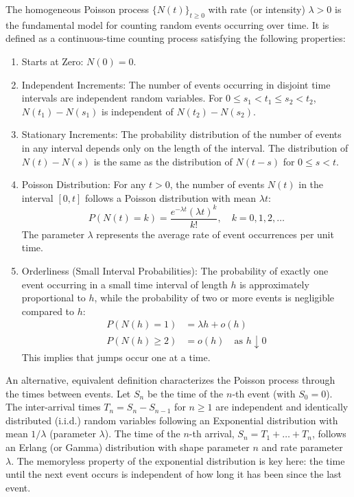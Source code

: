 \documentclass[11pt,twoside,openright]{report}
\begin{document}
The homogeneous Poisson process $\{N(t)\}_{t \ge 0}$ with rate (or intensity) $\lambda > 0$ is the fundamental model for counting random events occurring over time. It is defined as a continuous-time counting process satisfying the following properties:
\begin{enumerate}
    \item Starts at Zero: $N(0) = 0$.
    \item Independent Increments: The number of events occurring in disjoint time intervals are independent random variables. For $0 \le s_1 < t_1 \le s_2 < t_2$, $N(t_1) - N(s_1)$ is independent of $N(t_2) - N(s_2)$.
    \item Stationary Increments: The probability distribution of the number of events in any interval depends only on the length of the interval. The distribution of $N(t) - N(s)$ is the same as the distribution of $N(t-s)$ for $0 \le s < t$.
    \item Poisson Distribution: For any $t > 0$, the number of events $N(t)$ in the interval $[0, t]$ follows a Poisson distribution with mean $\lambda t$:
    \begin{equation}
    P(N(t)=k) = \frac{e^{-\lambda t}(\lambda t)^k}{k!}, \quad k = 0, 1, 2, \dots
    \label{eq:poisson_distribution}
    \end{equation}
    The parameter $\lambda$ represents the average rate of event occurrences per unit time.
    \item Orderliness (Small Interval Probabilities): The probability of exactly one event occurring in a small time interval of length $h$ is approximately proportional to $h$, while the probability of two or more events is negligible compared to $h$:
    \begin{align}
        P(N(h)=1) &= \lambda h + o(h) \label{eq:poisson_orderliness_1} \\
        P(N(h) \ge 2) &= o(h) \quad \text{as } h \downarrow 0 \label{eq:poisson_orderliness_2}
    \end{align}
    This implies that jumps occur one at a time.
\end{enumerate}
An alternative, equivalent definition characterizes the Poisson process through the times between events. Let $S_n$ be the time of the $n$-th event (with $S_0 = 0$). The inter-arrival times $T_n = S_n - S_{n-1}$ for $n \ge 1$ are independent and identically distributed (i.i.d.) random variables following an Exponential distribution with mean $1/\lambda$ (parameter $\lambda$). The time of the $n$-th arrival, $S_n = T_1 + \dots + T_n$, follows an Erlang (or Gamma) distribution with shape parameter $n$ and rate parameter $\lambda$. The memoryless property of the exponential distribution is key here: the time until the next event occurs is independent of how long it has been since the last event.
\end{document}
